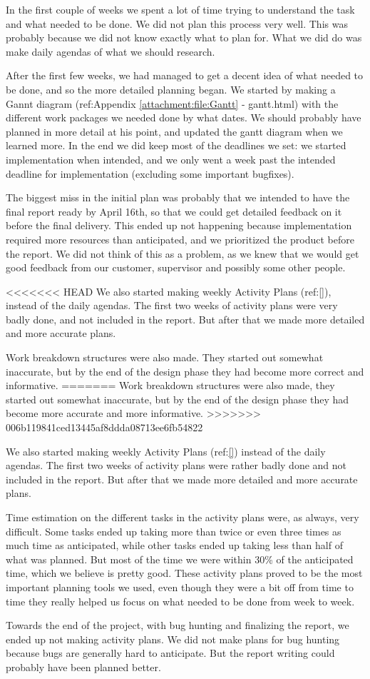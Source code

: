 In the first couple of weeks we spent a lot of time trying to understand the task and what needed to be done. We did not plan this process very well. This was probably because we did not know exactly what to plan for. What we did do was make daily agendas of what we should research.

After the first few weeks, we had managed to get a decent idea of what needed to be done, and so the more detailed planning began. We started by making a Gannt diagram (ref:Appendix \ref{attachment:file:Gantt} - gantt.html) with the different work packages we needed done by what dates. We should probably have planned in more detail at his point, and updated the gantt diagram when we learned more. In the end we did keep most of the deadlines we set: we started implementation when intended, and we only went a week past the intended deadline for implementation (excluding some important bugfixes). 

The biggest miss in the initial plan was probably that we intended to have the final report ready by April 16th, so that we could get detailed feedback on it before the final delivery. This ended up not happening because implementation required more resources than anticipated, and we prioritized the product before the report. We did not think of this as a problem, as we knew that we would get good feedback from our customer, supervisor and possibly some other people.

<<<<<<< HEAD
We also started making weekly Activity Plans (ref:\ref{}), instead of the daily agendas. The first two weeks of activity plans were very badly done, and not included in the report. But after that we made more detailed and more accurate plans.

Work breakdown structures were also made. They started out somewhat inaccurate, but by the end of the design phase they had become more correct and informative. 
=======
Work breakdown structures were also made, they started out somewhat inaccurate, but by the end of the design phase they had become more accurate and more informative. 
>>>>>>> 006b119841ced13445af8ddda08713ee6fb54822

We also started making weekly Activity Plans (ref:\ref{}) instead of the daily agendas. The first two weeks of activity plans were rather badly done and not included in the report. But after that we made more detailed and more accurate plans.

Time estimation on the different tasks in the activity plans were, as always, very difficult. Some tasks ended up taking more than twice or even three times as much time as anticipated, while other tasks ended up taking less than half of what was planned. But most of the time we were within 30\% of the anticipated time, which we believe is pretty good. These activity plans proved to be the most important planning tools we used, even though they were a bit off from time to time they really helped us focus on what needed to be done from week to week.

Towards the end of the project, with bug hunting and finalizing the report, we ended up not making activity plans. We did not make plans for bug hunting because bugs are generally hard to anticipate. But the report writing could probably have been planned better.
